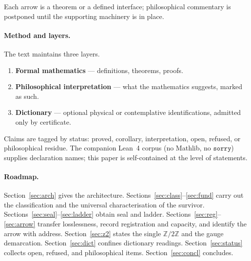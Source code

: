 \documentclass[11pt,a4paper]{article}
\theoremstyle{plain}
\theoremstyle{definition}
\theoremstyle{remark}
\newcommand{\Ztwo}{\mathbb{Z}/2\mathbb{Z}}
\begin{document}
\begin{center}
\end{center}
Each arrow is a theorem or a defined interface; philosophical commentary
is postponed until the supporting machinery is in place.

\paragraph{Method and layers.}
The text maintains three layers.
\begin{enumerate}[label=(\arabic*)]
\item \textbf{Formal mathematics} --- definitions, theorems, proofs.
\item \textbf{Philosophical interpretation} --- what the mathematics
suggests, marked as such.
\item \textbf{Dictionary} --- optional physical or contemplative
identifications, admitted only by certificate.
\end{enumerate}
Claims are tagged by status: proved, corollary, interpretation, open,
refused, or philosophical residue. The companion Lean~4 corpus (no
Mathlib, no $\mathtt{sorry}$) supplies declaration names; this paper is
self-contained at the level of statements.

\paragraph{Roadmap.}
Section~\ref{sec:arch} gives the architecture.
Sections~\ref{sec:class}--\ref{sec:fund} carry out the classification and
the universal characterisation of the survivor.
Sections~\ref{sec:seal}--\ref{sec:ladder} obtain seal and ladder.
Sections~\ref{sec:reg}--\ref{sec:arrow} transfer losslessness, record
registration and capacity, and identify the arrow with address.
Section~\ref{sec:z2} states the single $\Ztwo$ and the gauge demarcation.
Section~\ref{sec:dict} confines dictionary readings.
Section~\ref{sec:status} collects open, refused, and philosophical items.
Section~\ref{sec:concl} concludes.
\end{document}
